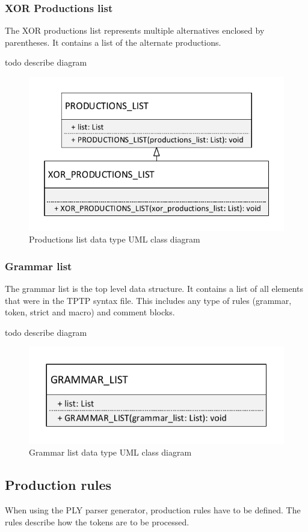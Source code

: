 \subsubsection{XOR Productions list}
The XOR productions list represents multiple alternatives enclosed by parentheses. It contains a list of the alternate productions.
 
 todo describe diagram
\begin{figure}[H]
\centering
\includegraphics[width=.6\textwidth]{images/Concept_uml_data_types_productions_list.pdf}
\caption{Productions list data type UML class diagram}
\label{fig:ConceptProductionsListClassDiagram}
\end{figure}

\subsubsection{Grammar list}
The grammar list is the top level data structure. It contains a list of all elements that were in the \ac{TPTP} syntax file.
This includes any type of rules (grammar, token, strict and macro) and comment blocks.

todo describe diagram
\begin{figure}[H]
\centering
\includegraphics[width=.5\textwidth]{images/Concept_uml_data_types_grammar_list.pdf}
\caption{Grammar list data type UML class diagram}
\label{fig:ConceptGrammarListClassDiagram}
\end{figure}
\subsection{Production rules}
When using the \ac{PLY} parser generator, production rules have to be defined.
The rules describe how the tokens are to be processed.

